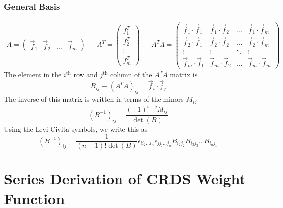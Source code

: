 \subsubsection{General Basis}
\begin{align}
	A = 
	\begin{pmatrix}
		\vec{f}_1 & \vec{f}_2 & \ldots & \vec f_m
	\end{pmatrix}
	&&
	A^T =
	\begin{pmatrix}
		f_1^T \\ f_2^T \\ \vdots \\ f_m^T
	\end{pmatrix}
	&&
	A^T A = 
	\begin{pmatrix}
		\vec{f}_1 \cdot \vec{f}_1 & \vec{f}_1 \cdot \vec{f}_2 & \ldots & \vec f_1\cdot\vec f_m \\
		\vec{f}_2 \cdot \vec{f}_1 & \vec{f}_2 \cdot \vec{f}_2 & \ldots & \vec{f}_2 \cdot \vec{f}_m \\
		\vdots & \vdots\ & \ddots & \vdots \\
		\vec{f}_m \cdot \vec{f}_1 & \vec{f}_m \cdot \vec{f}_2 & \ldots & \vec f_m\cdot\vec f_m
	\end{pmatrix}
\end{align}
The element in the $i^\mathrm{th}$ row and $j^\mathrm{th}$ column of the $A^TA$ matrix is
\begin{equation}
	B_{ij} \equiv \left(A^TA\right)_{ij} = \vec f_i\cdot\vec f_j
\end{equation}
The inverse of this matrix is written in terms of the minors $M_{ij}$
\begin{equation}
	\left(B^{-1}\right)_{ij} = \frac{(-1)^{i+j}M_{ij}}{\det\left(B\right)}
\end{equation}
Using the Levi-Civita symbols, we write this as
\begin{equation}
	\left(B^{-1}\right)_{ij} = \frac{1}{(n-1)!\det\left(B\right)}\epsilon_{i i_2\ldots i_n}\epsilon_{j j_2\ldots j_n}B_{i_2j_2}B_{i_3j_3}\ldots B_{i_nj_n}
\end{equation}

\section{Series Derivation of CRDS Weight Function} \label{sec:append_weight_series_crds}


